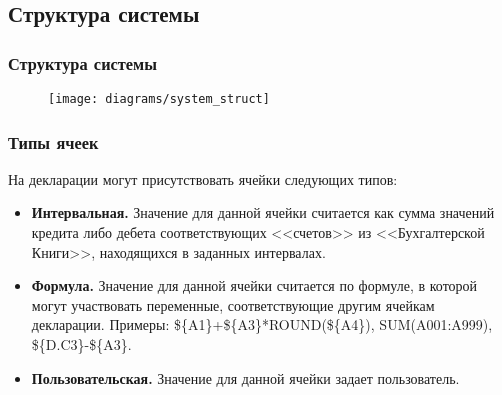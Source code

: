 \documentclass[xcolor=pdftex, dvipsnames, table]{beamer}
\begin{document}
\subsection{Структура системы}
\begin{frame}
  \frametitle{Структура системы}
  \begin{figure}
    \begin{center}
      \texttt{[image: diagrams/system\_struct]}
    \end{center}
  \end{figure}
\end{frame}
\begin{frame}
  \frametitle{Типы ячеек}
  На декларации могут присутствовать ячейки следующих типов:
  \begin{itemize}
    \item \textbf{Интервальная.} Значение для данной ячейки считается как сумма значений кредита либо дебета соответствующих <<счетов>> из <<Бухгалтерской Книги>>, находящихся в заданных интервалах.
    \item \textbf{Формула.} Значение для данной ячейки считается по формуле, в которой могут участвовать переменные, соответствующие другим ячейкам декларации. Примеры: \$\{A1\}+\$\{A3\}*ROUND(\$\{A4\}), SUM(A001:A999), \$\{D.C3\}-\$\{A3\}.
    \item \textbf{Пользовательская.} Значение для данной ячейки задает пользователь.
  \end{itemize}
\end{frame}
\end{document}
